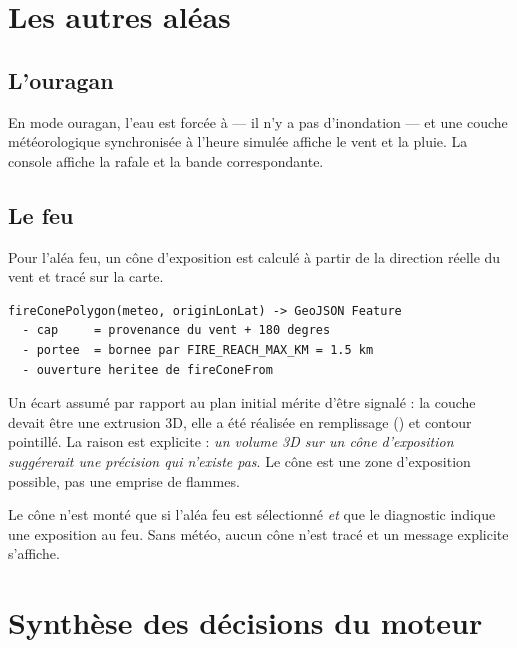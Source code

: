 \section{Les autres aléas}

\subsection{L'ouragan}

En mode ouragan, l'eau est forcée à  — il n'y a pas d'inondation —
et une couche météorologique synchronisée à l'heure simulée affiche le vent et
la pluie. La console affiche la rafale et la bande correspondante.

\subsection{Le feu}

Pour l'aléa feu, un cône d'exposition est calculé à partir de la direction
réelle du vent et tracé sur la carte.

\begin{lstlisting}[caption={Construction du cône d'exposition au feu.},
label={lst:fire}]
fireConePolygon(meteo, originLonLat) -> GeoJSON Feature
  - cap     = provenance du vent + 180 degres
  - portee  = bornee par FIRE_REACH_MAX_KM = 1.5 km
  - ouverture heritee de fireConeFrom
\end{lstlisting}

Un écart assumé par rapport au plan initial mérite d'être signalé : la couche
devait être une extrusion 3D, elle a été réalisée en remplissage
() et contour pointillé. La raison est explicite : \emph{un volume
3D sur un cône d'exposition suggérerait une précision qui n'existe pas}. Le
cône est une zone d'exposition possible, pas une emprise de flammes.

Le cône n'est monté que si l'aléa feu est sélectionné \emph{et} que le
diagnostic indique une exposition au feu. Sans météo, aucun cône n'est tracé et
un message explicite s'affiche.

\section{Synthèse des décisions du moteur}

